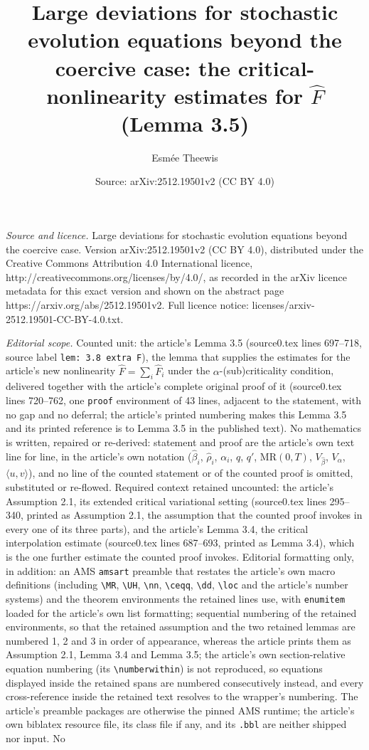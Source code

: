 \documentclass[10pt,a4paper]{amsart}
\title[Large deviations for stochastic evolution equations beyond the coercive case]{Large deviations for stochastic evolution equations beyond the coercive case: the critical-nonlinearity estimates for $\hat{F}$ (Lemma 3.5)}
\author{Esmée Theewis}
\date{Source: arXiv:2512.19501v2 (CC BY 4.0)}
\providecommand{\MR}{}\renewcommand{\MR}{\mathrm{MR}}
\newcommand{\<}{\langle}
\newcommand{\?}{\rangle}
\theoremstyle{plain}
\begin{document}
\maketitle

\noindent\emph{Source and licence.} Large deviations for stochastic evolution equations beyond the coercive case. Version arXiv:2512.19501v2 (CC BY 4.0), distributed under the Creative Commons Attribution 4.0 International licence, http://creativecommons.org/licenses/by/4.0/, as recorded in the arXiv licence metadata for this exact version and shown on the abstract page https://arxiv.org/abs/2512.19501v2. Full licence notice: licenses/arxiv-2512.19501-CC-BY-4.0.txt.\par\smallskip

\noindent\textit{Editorial scope.} Counted unit: the article's Lemma 3.5 (source0.tex lines 697--718, source label \texttt{lem: 3.8 extra F}), the lemma that supplies the estimates for the article's new nonlinearity $\hat{F}=\sum_i\hat{F}_i$ under the $\alpha$-(sub)criticality condition, delivered together with the article's complete original proof of it (source0.tex lines 720--762, one \texttt{proof} environment of 43 lines, adjacent to the statement, with no gap and no deferral; the article's printed numbering makes this Lemma 3.5 and its printed reference is to Lemma 3.5 in the published text). No mathematics is written, repaired or re-derived: statement and proof are the article's own text line for line, in the article's own notation ($\hat{\beta}_i$, $\hat{\rho}_i$, $\alpha_i$, $q$, $q'$, $\MR(0,T)$, $V_{\hat{\beta}}$, $V_\alpha$, $\<u,v\?$), and no line of the counted statement or of the counted proof is omitted, substituted or re-flowed. Required context retained uncounted: the article's Assumption 2.1, its extended critical variational setting (source0.tex lines 295--340, printed as Assumption 2.1, the assumption that the counted proof invokes in every one of its three parts), and the article's Lemma 3.4, the critical interpolation estimate (source0.tex lines 687--693, printed as Lemma 3.4), which is the one further estimate the counted proof invokes. Editorial formatting only, in addition: an AMS \texttt{amsart} preamble that restates the article's own macro definitions (including \texttt{\textbackslash MR}, \texttt{\textbackslash UH}, \texttt{\textbackslash nn}, \texttt{\textbackslash ceqq}, \texttt{\textbackslash dd}, \texttt{\textbackslash loc} and the article's number systems) and the theorem environments the retained lines use, with \texttt{enumitem} loaded for the article's own list formatting; sequential numbering of the retained environments, so that the retained assumption and the two retained lemmas are numbered 1, 2 and 3 in order of appearance, whereas the article prints them as Assumption 2.1, Lemma 3.4 and Lemma 3.5; the article's own section-relative equation numbering (its \texttt{\textbackslash numberwithin}) is not reproduced, so equations displayed inside the retained spans are numbered consecutively instead, and every cross-reference inside the retained text resolves to the wrapper's numbering. The article's preamble packages are otherwise the pinned AMS runtime; the article's own biblatex resource file, its class file if any, and its \texttt{.bbl} are neither shipped nor input. No 
\end{document}
